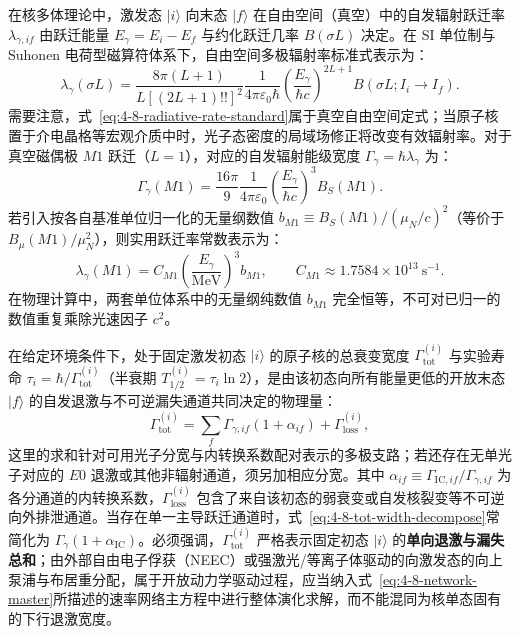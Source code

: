 在核多体理论中，激发态 $|i\rangle$ 向末态 $|f\rangle$ 在自由空间（真空）中的自发辐射跃迁率 $\lambda_{\gamma, if}$ 由跃迁能量 $E_\gamma = E_i - E_f$ 与约化跃迁几率 $B(\sigma L)$ 决定。在 SI 单位制与 Suhonen 电荷型磁算符体系下，自由空间多极辐射率标准式表示为：
\begin{equation}\label{eq:4-8-radiative-rate-standard}
\lambda_\gamma(\sigma L) = \frac{8\pi (L+1)}{L [(2L+1)!!]^2} \frac{1}{4\pi\varepsilon_0 \hbar} \left(\frac{E_\gamma}{\hbar c}\right)^{2L+1} B(\sigma L; I_i \to I_f).
\end{equation}
需要注意，式~\eqref{eq:4-8-radiative-rate-standard}属于真空自由空间定式；当原子核置于介电晶格等宏观介质中时，光子态密度的局域场修正将改变有效辐射率。对于真空磁偶极 $M1$ 跃迁（$L=1$），对应的自发辐射能级宽度 $\Gamma_\gamma = \hbar \lambda_\gamma$ 为：
\begin{equation}\label{eq:4-8-gamma-m1-width}
\Gamma_\gamma(M1) = \frac{16\pi}{9} \frac{1}{4\pi\varepsilon_0} \left(\frac{E_\gamma}{\hbar c}\right)^3 B_S(M1).
\end{equation}
若引入按各自基准单位归一化的无量纲数值 $b_{M1} \equiv B_S(M1) / (\mu_N/c)^2$（等价于 $B_\mu(M1) / \mu_N^2$），则实用跃迁率常数表示为：
\begin{equation}\label{eq:4-8-m1-practical-rate}
\lambda_\gamma(M1) = C_{M1} \left(\frac{E_\gamma}{\mathrm{MeV}}\right)^3 b_{M1}, \qquad C_{M1} \approx 1.7584 \times 10^{13}\ \mathrm{s}^{-1}.
\end{equation}
在物理计算中，两套单位体系中的无量纲纯数值 $b_{M1}$ 完全恒等，不可对已归一的数值重复乘除光速因子 $c^2$。

在给定环境条件下，处于固定激发初态 $|i\rangle$ 的原子核的总衰变宽度 $\Gamma_{\mathrm{tot}}^{(i)}$ 与实验寿命 $\tau_i = \hbar / \Gamma_{\mathrm{tot}}^{(i)}$（半衰期 $T_{1/2}^{(i)} = \tau_i \ln 2$），是由该初态向所有能量更低的开放末态 $|f\rangle$ 的自发退激与不可逆漏失通道共同决定的物理量：
\begin{equation}\label{eq:4-8-tot-width-decompose}
\Gamma_{\mathrm{tot}}^{(i)} = \sum_{f} \Gamma_{\gamma, if} \left(1 + \alpha_{if}\right) + \Gamma_{\mathrm{loss}}^{(i)},
\end{equation}
这里的求和针对可用光子分宽与内转换系数配对表示的多极支路；若还存在无单光子对应的 $E0$ 退激或其他非辐射通道，须另加相应分宽。其中 $\alpha_{if} \equiv \Gamma_{\mathrm{IC}, if} / \Gamma_{\gamma, if}$ 为各分通道的内转换系数，$\Gamma_{\mathrm{loss}}^{(i)}$ 包含了来自该初态的弱衰变或自发核裂变等不可逆向外排泄通道。当存在单一主导跃迁通道时，式~\eqref{eq:4-8-tot-width-decompose}常简化为 $\Gamma_\gamma(1 + \alpha_{\mathrm{IC}})$。必须强调，$\Gamma_{\mathrm{tot}}^{(i)}$ 严格表示固定初态 $|i\rangle$ 的\textbf{单向退激与漏失总和}；由外部自由电子俘获（NEEC）或强激光/等离子体驱动的向激发态的向上泵浦与布居重分配，属于开放动力学驱动过程，应当纳入式~\eqref{eq:4-8-network-master}所描述的速率网络主方程中进行整体演化求解，而不能混同为核单态固有的下行退激宽度。

